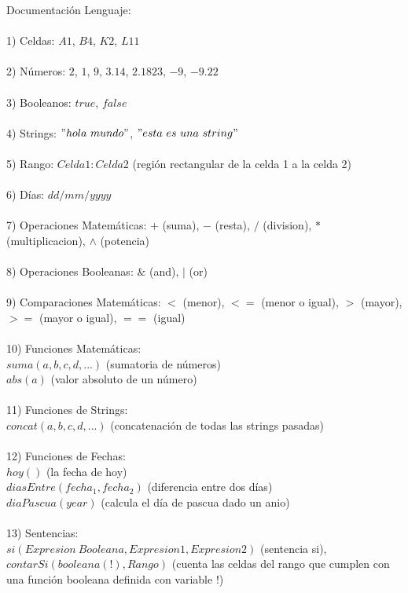 \documentclass[10pt,a4paper]{report}
\begin{document}
 
Documentaci\'on Lenguaje: \\\\
1) Celdas: $A1$, $B4$, $K2$, $L11$ \\\\
2) N\'umeros: $2$, $1$, $9$, $3.14$, $2.1823$, $-9$, $-9.22$\\\\
3) Booleanos: $true$, $false$ \\\\
4) Strings: $"hola\ mundo"$, $"esta\ es\ una\ string"$ \\\\
5) Rango: $Celda1:Celda2$ (regi\'on rectangular de la celda 1 a la celda 2) \\\\
6) D\'ias: $dd/mm/yyyy$ \\\\
7) Operaciones Matem\'aticas: $+$ (suma), $-$ (resta), $/$ (division), $*$ (multiplicacion), $\wedge$ (potencia) \\\\
8) Operaciones Booleanas: $\&$ (and), $|$ (or) \\\\
9) Comparaciones Matem\'aticas: $<$ (menor), $<=$ (menor o igual), $>$ (mayor), $>=$ (mayor o igual), $==$ (igual) \\\\
10) Funciones Matem\'aticas: \\
 $suma(a,b,c,d,...)$ (sumatoria de n\'umeros) \\
 $abs(a)$ (valor absoluto de un n\'umero) \\\\
11) Funciones de Strings: \\
  $concat(a,b,c,d,...)$ (concatenaci\'on de todas las strings pasadas) \\\\
12) Funciones de Fechas: \\
  $hoy()$ (la fecha de hoy) \\
  $diasEntre(fecha_1,fecha_2)$ (diferencia entre dos d\'ias) \\
  $diaPascua(year)$ (calcula el d\'ia de pascua dado un anio) \\\\
13) Sentencias:\\ $si(Expresion\ Booleana,Expresion1,Expresion2)$ (sentencia si), \\ $contarSi(booleana(!),Rango)$ (cuenta las celdas del rango que cumplen con una funci\'on booleana definida con variable $!$) \\\\
\end{document}
